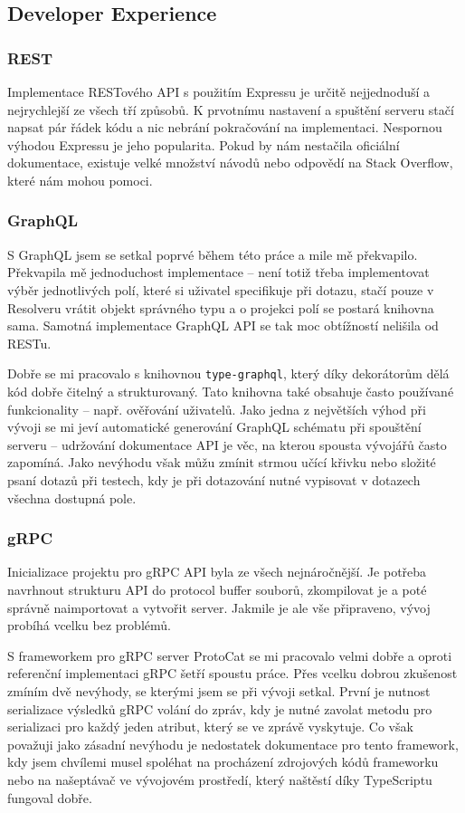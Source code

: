 \documentclass[thesis=M,czech]{FITthesis}[2019/12/23]
\begin{document}
\subsection{Developer Experience}
\subsubsection*{REST}
Implementace RESTového API s použitím Expressu je určitě nejjednoduší a nejrychlejší ze všech tří způsobů. K prvotnímu nastavení a spuštění serveru stačí napsat pár řádek kódu a nic nebrání pokračování na implementaci.
Nespornou výhodou Expressu je jeho popularita. Pokud by nám nestačila oficiální dokumentace, existuje velké množství návodů nebo odpovědí na Stack Overflow, které nám mohou pomoci.

\subsubsection*{GraphQL}
S GraphQL jsem se setkal poprvé během této práce a mile mě překvapilo. Překvapila mě jednoduchost implementace -- není totiž třeba implementovat výběr jednotlivých polí, které si uživatel specifikuje při dotazu, stačí pouze v Resolveru vrátit objekt správného typu a o projekci polí se postará knihovna sama. Samotná implementace GraphQL API se tak moc obtížností nelišila od RESTu. 

Dobře se mi pracovalo s knihovnou \texttt{type-graphql}\cite{typegraphql_doc}, který díky dekorátorům dělá kód dobře čitelný a strukturovaný. Tato knihovna také obsahuje často používané funkcionality -- např. ověřování uživatelů. Jako jedna z největších výhod při vývoji se mi jeví automatické generování GraphQL schématu při spouštění serveru -- udržování dokumentace API je věc, na kterou spousta vývojářů často zapomíná. Jako nevýhodu však můžu zmínit strmou učící křivku nebo složité psaní dotazů při testech, kdy je při dotazování nutné vypisovat v dotazech všechna dostupná pole.

\subsubsection*{gRPC}
Inicializace projektu pro gRPC API byla ze všech nejnáročnější. Je potřeba navrhnout strukturu API do protocol buffer souborů, zkompilovat je a poté správně naimportovat a vytvořit server. Jakmile je ale vše připraveno, vývoj probíhá vcelku bez problémů.

S frameworkem pro gRPC server ProtoCat se mi pracovalo velmi dobře a oproti referenční implementaci gRPC šetří spoustu práce. Přes vcelku dobrou zkušenost zmíním dvě nevýhody, se kterými jsem se při vývoji setkal. První je nutnost serializace výsledků gRPC volání do zpráv, kdy je nutné zavolat metodu pro serializaci pro každý jeden atribut, který se ve zprávě vyskytuje. Co však považuji jako zásadní nevýhodu je nedostatek dokumentace pro tento framework, kdy jsem chvílemi musel spoléhat na procházení zdrojových kódů frameworku nebo na našeptávač ve vývojovém prostředí, který naštěstí díky TypeScriptu fungoval dobře.
\end{document}
